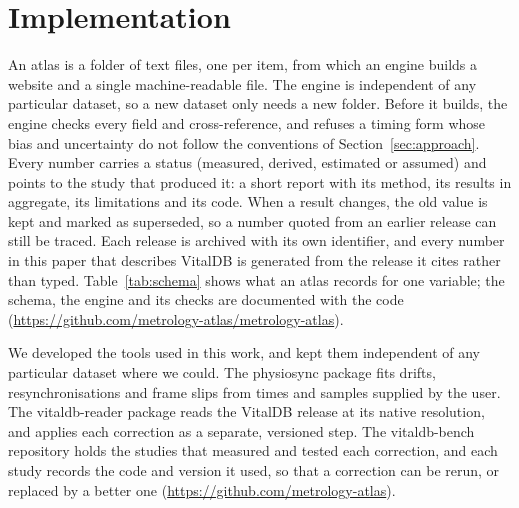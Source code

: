 \documentclass[11pt,a4paper]{article}
\begin{document}
\section{Implementation}
\label{sec:system}

An atlas is a folder of text files, one per item, from which an engine builds a website and a single
machine-readable file. The engine is independent of any particular dataset, so a new dataset only needs a new folder. Before
it builds, the engine checks every field and cross-reference, and refuses a timing form whose bias and uncertainty do
not follow the conventions of Section~\ref{sec:approach}. Every number carries a status (measured, derived, estimated
or assumed) and points to the study that produced it: a short report with its method, its results in aggregate, its
limitations and its code. When a result changes, the old value is kept and marked as superseded, so a number quoted
from an earlier release can still be traced. Each release is archived with its own identifier, and every number in
this paper that describes VitalDB is generated from the release it cites rather than typed.
Table~\ref{tab:schema} shows what an atlas records for one variable; the schema, the engine and its checks are
documented with the code (\url{https://github.com/metrology-atlas/metrology-atlas}).

We developed the tools used in this work, and kept them independent of any particular dataset where we could. The
physiosync package fits drifts, resynchronisations and frame slips from times and samples supplied by the user. The
vitaldb-reader package reads the VitalDB release at its native resolution, and applies each correction as a separate,
versioned step. The vitaldb-bench repository holds the studies that measured and tested each correction, and each
study records the code and version it used, so that a correction can be rerun, or replaced by a better one
(\url{https://github.com/metrology-atlas}).
\end{document}
